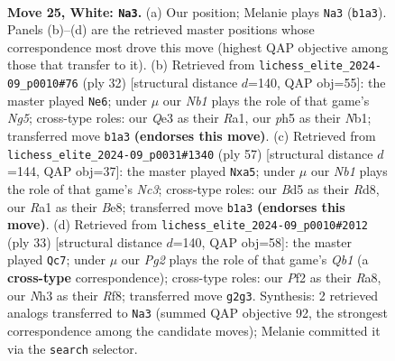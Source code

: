 \documentclass[11pt]{article}
\begin{document}
\clearpage

\begin{figure}[p]\centering
\begin{subfigure}{0.46\textwidth}\centering
\resizebox{\linewidth}{!}{%
\newchessgame
\chessboard[
  setfen={2bqn1r1/4bpk1/p5p1/n1BBp2p/P3P3/3PQ2N/1rP1RPPP/RN4K1 w - - 2 25},
  showmover=false,
  pgfstyle=straightmove, color=movearrow, markmove={b1-a3}
]}
\caption{}
\end{subfigure}\hfill
\begin{subfigure}{0.46\textwidth}\centering
\resizebox{\linewidth}{!}{%
\newchessgame
\chessboard[
  setfen={r3k2r/2pb3p/pbn2pqn/3Bp1N1/p3P1P1/2P3Q1/1P3PP1/RNB2RK1 w kq - 0 17},
  showmover=false,
  pgfstyle=straightmove, color=movearrow, markmove={g5-e6}
]}
\caption{}
\end{subfigure}
\\[4pt]
\begin{subfigure}{0.46\textwidth}\centering
\resizebox{\linewidth}{!}{%
\newchessgame
\chessboard[
  setfen={1k1rb2r/pp3qpp/2n2p2/B1b1p3/Q5B1/P2PP2P/3N1PP1/1RR3K1 b - - 8 29},
  showmover=false,
  pgfstyle=straightmove, color=movearrow, markmove={c6-a5}
]}
\caption{}
\end{subfigure}\hfill
\begin{subfigure}{0.46\textwidth}\centering
\resizebox{\linewidth}{!}{%
\newchessgame
\chessboard[
  setfen={rq3rk1/pp2bp1p/2bp2p1/4nR2/3BP2P/2N3Q1/PPP1B1P1/3R2K1 b - - 0 17},
  showmover=false,
  pgfstyle=straightmove, color=movearrow, markmove={b8-c7}
]}
\caption{}
\end{subfigure}
\caption{\textbf{Move 25, White: \texttt{Na3}.} (a) Our position; Melanie plays \texttt{Na3} (\texttt{b1a3}). Panels (b)--(d) are the retrieved master positions whose correspondence most drove this move (highest QAP objective among those that transfer to it). (b) Retrieved from \texttt{lichess\_elite\_2024-09\_p0010\#76} (ply 32) [structural distance $d$=140, QAP obj=55]: the master played \texttt{Ne6}; under $\mu$ our \emph{Nb1} plays the role of that game's \emph{Ng5}; cross-type roles: our \emph{Q}e3 as their \emph{R}a1, our \emph{p}h5 as their \emph{N}b1; transferred move \texttt{b1a3} \textbf{(endorses this move)}. (c) Retrieved from \texttt{lichess\_elite\_2024-09\_p0031\#1340} (ply 57) [structural distance $d$=144, QAP obj=37]: the master played \texttt{Nxa5}; under $\mu$ our \emph{Nb1} plays the role of that game's \emph{Nc3}; cross-type roles: our \emph{B}d5 as their \emph{R}d8, our \emph{R}a1 as their \emph{B}e8; transferred move \texttt{b1a3} \textbf{(endorses this move)}. (d) Retrieved from \texttt{lichess\_elite\_2024-09\_p0010\#2012} (ply 33) [structural distance $d$=140, QAP obj=58]: the master played \texttt{Qc7}; under $\mu$ our \emph{Pg2} plays the role of that game's \emph{Qb1} (a \textbf{cross-type} correspondence); cross-type roles: our \emph{P}f2 as their \emph{R}a8, our \emph{N}h3 as their \emph{R}f8; transferred move \texttt{g2g3}. Synthesis: 2 retrieved analogs transferred to \texttt{Na3} (summed QAP objective 92, the strongest correspondence among the candidate moves); Melanie committed it via the \texttt{search} selector.}
\label{fig:thought-m48}
\end{figure}
\end{document}

